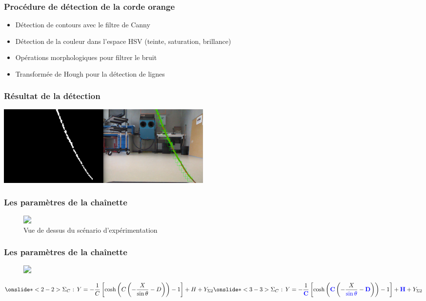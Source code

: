 \documentclass[10pt]{beamer}
\begin{document}
\begin{frame}
\frametitle{Procédure de détection de la corde orange}
\begin{itemize}
\item Détection de contours avec le filtre de Canny
\item Détection de la couleur dans l'espace HSV (teinte, saturation, brillance) \\
\item Opérations morphologiques pour filtrer le bruit
\item <2-2>Transformée de Hough pour la détection de lignes
\end{itemize}
\end{frame}

\begin{frame}
\frametitle{Résultat de la détection}
\begin{center}
\includegraphics[height=4cm, keepaspectratio]{Pictures/ropeDetection.png}
\end{center}
\end{frame}

\begin{frame}
\frametitle{Les paramètres de la chaînette}
\begin{center}
\begin{figure}
\includegraphics<1-1>[height= 6cm]{Pictures/turtle_linked.png}
\caption{Vue de dessus du scénario d'expérimentation}
\end{figure}
\end{center}
\end{frame}

\begin{frame}
\frametitle{Les paramètres de la chaînette}
\begin{center}
\begin{figure}
\includegraphics<1->[height= 5cm]{Pictures/turtle_catenary_def.png}
\end{figure}
\end{center}
\begin{equation*}
\onslide*<2-2>
{
\Sigma_C\text{ : } Y = -\frac{1}{C}\left[\cosh\left(C\left(-\frac{X}{\sin\theta}-D\right)\right)-1\right]+H+Y_{\Sigma2}
}
\onslide*<3-3>
{
\Sigma_C\text{ : } Y = -\frac{1}{\color{blue}\mathbf{C}}\left[\cosh\left({\color{blue}\mathbf{C}} \left(-\frac{X}{{\color{blue}\mathbf{\sin\theta}}}-{\color{blue}\mathbf{D}}\right)\right)-1\right]+\mathbf{\color{blue}H}+Y_{\Sigma2}
}
\end{equation*}
\end{frame}
\end{document}
